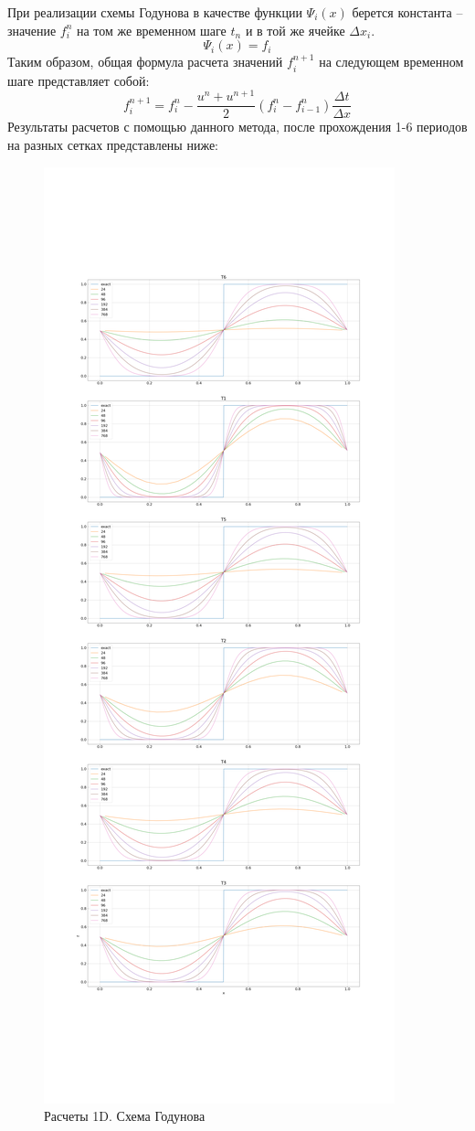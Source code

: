 \documentclass[12pt,a4paper]{article}
\begin{document}
При реализации схемы Годунова в качестве функции $\Psi_i(x)$ берется константа – значение $f_i^n$ на том же временном шаге $t_n$ и в той же ячейке $\Delta x_i$.
\[
\Psi_i(x)=f_i
\]
Таким образом, общая формула расчета значений $f_i^{n+1}$ на следующем временном шаге представляет собой:
\[
f_i^{n+1}=f_i^n-\frac{u^n+u^{n+1}}{2}(f_i^n-f_{i-1}^n)\frac{\Delta t}{\Delta x}
\]
Результаты расчетов с помощью данного метода, после прохождения 1-6 периодов на разных сетках представлены ниже:
\\
\begin{figure}[h!]
  \includegraphics[width=\linewidth]{Pictures/Godunov.png}
  \caption{Расчеты 1D. Схема Годунова}
  \label{fig:Godunov}
\end{figure}\\
\end{document}

